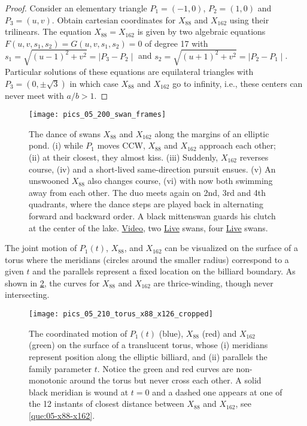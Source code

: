 \begin{proof}
Consider an elementary triangle $P_1=(-1,0)$, $P_2=(1,0)$ and $P_3=(u,v)$. Obtain cartesian coordinates for $X_{88}$ and $X_{162}$ using their trilinears. The equation $X_{88}=X_{162}$ is given by two algebraic equations $F(u,v,s_1,s_2)=G(u,v,s_1,s_2)=0$ of degree 17 with   $s_1=\sqrt{(u-1)^2+v^2}=\mid P_3-P_2\mid$ and $s_2=\sqrt{(u+1)^2+v^2}=\mid P_2-P_1\mid$.
Particular solutions of these equations are    equilateral triangles with $P_3=(0,\pm \sqrt{3})$ in which case $X_{88}$ and $X_{162}$ go to infinity, i.e., these centers can never meet with $a/b>1$.
\end{proof}

\begin{figure}
    \centering
    \texttt{[image: pics\_05\_200\_swan\_frames]}
    \caption{The dance of swans $X_{88}$ and $X_{162}$ along the margins of an elliptic pond. (i) while $P_1$ moves CCW, $X_{88}$ and $X_{162}$ approach each other; (ii) at their closest, they almost kiss. (iii) Suddenly, $X_{162}$ reverses course, (iv) and a short-lived same-direction pursuit ensues. (v) An unswooned $X_{88}$ also changes course, (vi) with now both swimming away from each other. The duo meets again on 2nd, 3rd and 4th quadrants, where the dance steps are played back in alternating forward and backward order. A black mittenswan guards his clutch at the center of the lake. \href{https://youtu.be/ljGTtA1x-Sk}{Video}, two \href{https://bit.ly/3f6M9Wh}{Live} swans, four \href{https://bit.ly/3oDhMdd}{Live} swans.}
    \label{fig:x88-x162}
\end{figure}

The joint motion of $P_1(t)$, $X_{88}$, and $X_{162}$ can be visualized on the surface of a torus where the meridians (circles around the smaller radius) correspond to a given $t$ and the parallels represent a fixed location on the billiard boundary. As shown in \cref{fig:05-3d-torus}, the curves for $X_{88}$ and $X_{162}$ are thrice-winding, though never intersecting.

\begin{figure}
    \centering
    \texttt{[image: pics\_05\_210\_torus\_x88\_x126\_cropped]}
    \caption{The coordinated motion of $P_1(t)$ (blue), $X_{88}$ (red) and $X_{162}$ (green) on the surface of a translucent torus, whose (i) meridians represent position along the elliptic billiard, and (ii) parallels the family parameter $t$. Notice the green and red curves are non-monotonic around the torus but never cross each other. A solid black meridian is wound at $t=0$ and a dashed one appears at one of the 12 instants of closest distance between $X_{88}$ and $X_{162}$, see \cref{que:05-x88-x162}.}
    \label{fig:05-3d-torus}
\end{figure}

